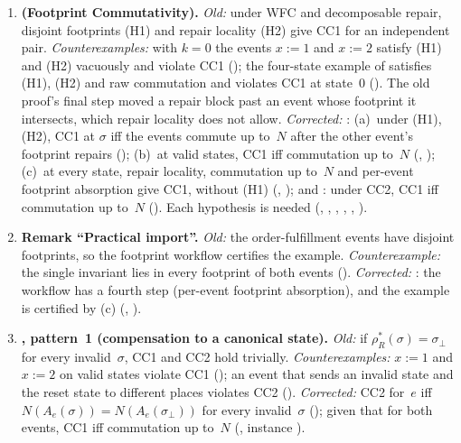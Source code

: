 \documentclass[11pt,a4paper]{article}
\theoremstyle{plain}
\theoremstyle{definition}
\theoremstyle{remark}
\renewcommand{\_}{\textunderscore\allowbreak}
\begin{document}
\begin{enumerate}[leftmargin=*,label=\textbf{E\arabic*.},ref=E\arabic*]
\item \textbf{ (Footprint Commutativity).}
  \emph{Old:} under WFC and decomposable repair, disjoint footprints (H1) and
  repair locality (H2) give CC1 for an independent pair.
  \emph{Counterexamples:} with $k = 0$ the events $x := 1$ and $x := 2$
  satisfy (H1) and (H2) vacuously and violate CC1
  (); the four-state example of
   satisfies (H1), (H2) and raw
  commutation and violates CC1 at state~0
  ().  The old proof's final step
  moved a repair block past an event whose footprint it intersects, which
  repair locality does not allow.
  \emph{Corrected:} : (a)~under (H1), (H2), CC1 at
  $\sigma$ iff the events commute up to~$N$ after the other event's footprint
  repairs (); (b)~at valid states, CC1 iff
  commutation up to~$N$ (,
  ); (c)~at every state, repair locality,
  commutation up to~$N$ and per-event footprint absorption give CC1, without
  (H1) (, ); and
  : under CC2, CC1 iff commutation up to~$N$
  ().  Each hypothesis is needed
  (, ,
  , ,
  , ).

\item \textbf{Remark ``Practical import''.}
  \emph{Old:} the order-fulfillment events have disjoint footprints, so the
  footprint workflow certifies the example.
  \emph{Counterexample:} the single invariant lies in every footprint of both
  events ().
  \emph{Corrected:} : the workflow has a fourth
  step (per-event footprint absorption), and the example is certified by
  (c) (,
  ).

\item \textbf{, pattern~1 (compensation to a canonical
  state).}
  \emph{Old:} if $\rho_R^*(\sigma) = \sigma_\bot$ for every invalid~$\sigma$,
  CC1 and CC2 hold trivially.
  \emph{Counterexamples:} $x := 1$ and $x := 2$ on valid states violate CC1
  (); an event that sends an invalid state and
  the reset state to different places violates CC2
  ().
  \emph{Corrected:} CC2 for~$e$ iff $N(A_e(\sigma)) = N(A_e(\sigma_\bot))$ for
  every invalid~$\sigma$ (); given that for both
  events, CC1 iff commutation up to~$N$ (,
  instance ).


\end{enumerate}
\end{document}
